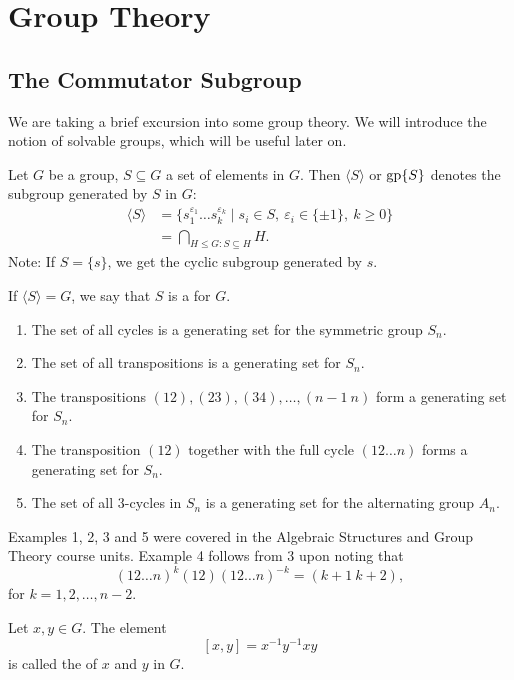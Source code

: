 \section{Group Theory}
\subsection{The Commutator Subgroup}
We are taking a brief excursion into some group theory. We will introduce the notion of solvable groups, which will be useful later on.

Let $G$ be a group, $S \subseteq G$ a set of elements in $G$. Then $\langle S \rangle$ or $\operatorname{gp}\{S\}$ denotes the subgroup generated by $S$ in $G$:
\begin{align*}
	\langle S \rangle &= \{s_1^{\varepsilon_1} \dots s_k^{\varepsilon_k} \mid s_i \in S,\ \varepsilon_i \in \{\pm 1\},\ k \geq 0\} \\
		& = \bigcap_{H \leq G : S \subseteq H}{H}.
\end{align*}
Note: If $S = \{s\}$, we get the cyclic subgroup generated by $s$.

If $\langle S \rangle = G$, we say that $S$ is a  for $G$.

\begin{examples}\hfill
	\begin{enumerate}
		\item The set of all cycles is a generating set for the symmetric group $S_n$.
		\item The set of all transpositions is a generating set for $S_n$.
		\item The transpositions $(12), (23), (34), \dots, (n - 1\ n)$ form a generating set for $S_n$.
		\item The transposition $(12)$ together with the full cycle $(12 \dots n)$ forms a generating set for $S_n$.
		\item The set of all $3$-cycles in $S_n$ is a generating set for the alternating group $A_n$.
	\end{enumerate}
	Examples 1, 2, 3 and 5 were covered in the Algebraic Structures and Group Theory course units. Example 4 follows from 3 upon noting that
	\[
		(12 \dots n)^k (12) (12 \dots n)^{-k} = (k + 1\ k + 2),
	\]
	for $k = 1, 2, \dots, n - 2$.
\end{examples}

\begin{definition}
	Let $x, y \in G$. The element
	\[
		[x, y] = x^{-1}y^{-1}xy
	\]\index{$[x, y]$}
	is called the  of $x$ and $y$ in $G$.
\end{definition}

